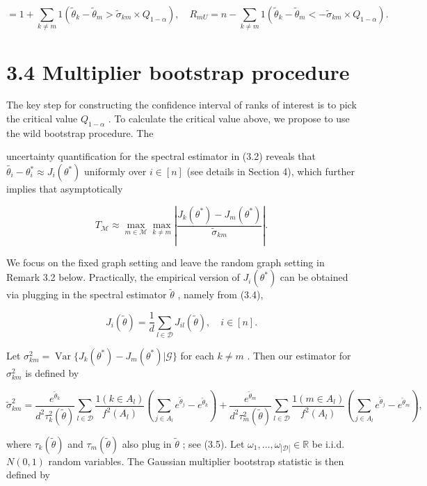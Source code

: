 \[
= 1 + \sum_{k \neq m} 1 \left(\widetilde{\theta}_k - \widetilde{\theta}_m > \widetilde{\sigma}_{km} \times Q_{1 - \alpha}\right), \quad R_{mU} = n - \sum_{k \neq m} 1 \left(\widetilde{\theta}_k - \widetilde{\theta}_m < -\widetilde{\sigma}_{km} \times Q_{1 - \alpha}\right).
\]

\section{3.4 Multiplier bootstrap
procedure}\label{multiplier-bootstrap-procedure}

The key step for constructing the confidence interval of ranks of
interest is to pick the critical value \(Q_{1 - \alpha}\) . To calculate
the critical value above, we propose to use the wild bootstrap
procedure. The

uncertainty quantification for the spectral estimator in (3.2) reveals
that
\(\widetilde{\theta_{i}} - \theta_{i}^{*} \approx J_{i}(\theta^{*})\)
uniformly over \(i \in [n]\) (see details in Section 4), which further
implies that asymptotically

\[
T_{\mathcal{M}} \approx \max_{m \in \mathcal{M}} \max_{k \neq m} \left| \frac{J_{k}(\theta^{*}) - J_{m}(\theta^{*})}{\widetilde{\sigma}_{km}} \right|. \tag{3.12}
\]

We focus on the fixed graph setting and leave the random graph setting
in Remark 3.2 below. Practically, the empirical version of
\(J_{i}(\theta^{*})\) can be obtained via plugging in the spectral
estimator \(\widetilde{\theta}\) , namely from (3.4),

\[
J_{i}(\widetilde{\theta}) = \frac{1}{d} \sum_{l \in \mathcal{D}} J_{il}(\widetilde{\theta}), \quad i \in [n].
\]

Let
\(\sigma_{km}^{2} = \operatorname {Var}\{J_{k}(\theta^{*}) - J_{m}(\theta^{*}) | \mathcal{G} \}\)
for each \(k \neq m\) . Then our estimator for \(\sigma_{km}^{2}\) is
defined by

\[
\widetilde{\sigma}_{km}^{2} = \frac{e^{\widetilde{\theta}_{k}}}{d^{2} \tau_{k}^{2}(\widetilde{\theta})} \sum_{l \in \mathcal{D}} \frac{1(k \in A_{l})}{f^{2}(A_{l})} \left(\sum_{j \in A_{l}} e^{\widetilde{\theta}_{j}} - e^{\widetilde{\theta}_{k}}\right) + \frac{e^{\widetilde{\theta}_{m}}}{d^{2} \tau_{m}^{2}(\widetilde{\theta})} \sum_{l \in \mathcal{D}} \frac{1(m \in A_{l})}{f^{2}(A_{l})} \left(\sum_{j \in A_{l}} e^{\widetilde{\theta}_{j}} - e^{\widetilde{\theta}_{m}}\right), \tag{3.13}
\]

where \(\tau_{k}(\widetilde{\theta})\) and
\(\tau_{m}(\widetilde{\theta})\) also plug in \(\widetilde{\theta}\) ;
see (3.5). Let
\(\omega_{1}, \ldots , \omega_{|\mathcal{D}|} \in \mathbb{R}\) be i.i.d.
\(N(0,1)\) random variables. The Gaussian multiplier bootstrap statistic
is then defined by

